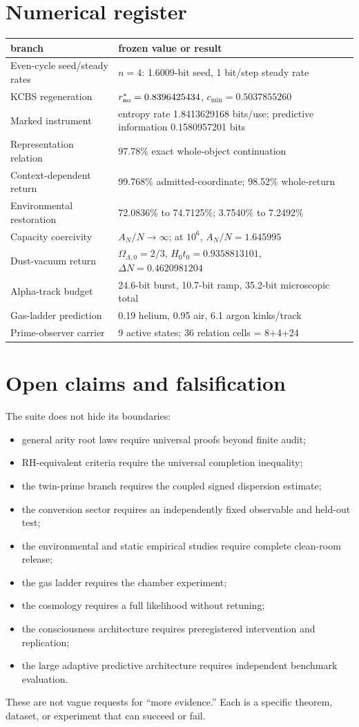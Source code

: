 \documentclass[11pt,a4paper]{article}
\begin{document}
\section{Numerical register}
\begin{longtable}{p{.36\linewidth}p{.48\linewidth}}
\toprule
branch & frozen value or result\\\midrule
Even-cycle seed/steady rates & $n=4$: 1.6009-bit seed, 1 bit/step steady rate\\
KCBS regeneration & $r_{\rm no}^*=0.8396425434$, $c_{\min}=0.5037855260$\\
Marked instrument & entropy rate 1.8413629168 bits/use; predictive information 0.1580957201 bits\\
Representation relation & 97.78\% exact whole-object continuation\\
Context-dependent return & 99.768\% admitted-coordinate; 98.52\% whole-return\\
Environmental restoration & 72.0836\% to 74.7125\%; 3.7540\% to 7.2492\%\\
Capacity coercivity & $A_N/N\to\infty$; at $10^6$, $A_N/N=1.645995$\\
Dust-vacuum return & $\Omega_{\Lambda,0}=2/3$, $H_0t_0=0.9358813101$, $\Delta N=0.4620981204$\\
Alpha-track budget & 24.6-bit burst, 10.7-bit ramp, 35.2-bit microscopic total\\
Gas-ladder prediction & 0.19 helium, 0.95 air, 6.1 argon kinks/track\\
Prime-observer carrier & 9 active states; 36 relation cells = 8+4+24\\
\bottomrule
\end{longtable}

\section{Open claims and falsification}
The suite does not hide its boundaries:
\begin{itemize}
\item general arity root laws require universal proofs beyond finite audit;
\item RH-equivalent criteria require the universal completion inequality;
\item the twin-prime branch requires the coupled signed dispersion estimate;
\item the conversion sector requires an independently fixed observable and held-out test;
\item the environmental and static empirical studies require complete clean-room release;
\item the gas ladder requires the chamber experiment;
\item the cosmology requires a full likelihood without retuning;
\item the consciousness architecture requires preregistered intervention and replication;
\item the large adaptive predictive architecture requires independent benchmark evaluation.
\end{itemize}
These are not vague requests for ``more evidence.'' Each is a specific theorem, dataset, or experiment that can succeed or fail.
\end{document}

